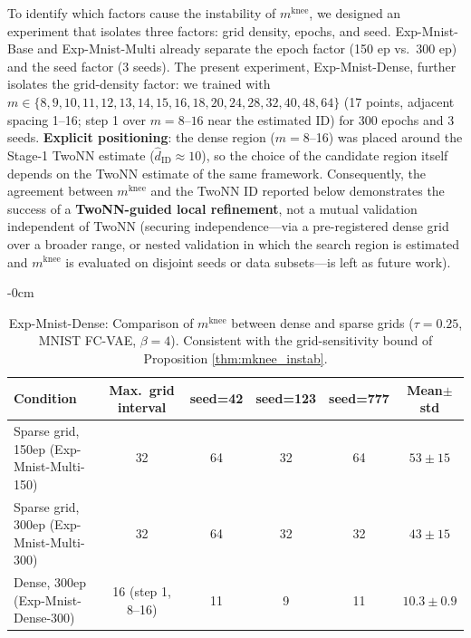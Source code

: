 \documentclass[make,article,submit,pdftex,moreauthors]{Definitions/mdpi}
\newcommand{\mknee}{m^{\mathrm{knee}}}
\begin{document}
To identify which factors cause the instability of $\mknee$, we designed an
experiment that isolates three factors: grid density, epochs, and seed.
Exp-Mnist-Base and Exp-Mnist-Multi already separate the epoch factor (150 ep vs.\ 300 ep) and
the seed factor (3 seeds).
The present experiment, Exp-Mnist-Dense, further isolates the grid-density factor: we trained
with $m \in \{8,9,10,11,12,13,14,15,16,18,20,24,28,32,40,48,64\}$
(17 points, adjacent spacing 1--16; step 1 over $m=8$--$16$ near the estimated ID) for 300 epochs and 3 seeds.
\textbf{Explicit positioning}: the dense region ($m = 8$--16) was placed around the Stage-1
TwoNN estimate ($\hat{d}_\mathrm{ID} \approx 10$), so the choice of the candidate region
itself depends on the TwoNN estimate of the same framework.
Consequently, the agreement between $\mknee$ and the TwoNN ID reported below demonstrates
the success of a \textbf{TwoNN-guided local refinement}, not a mutual validation
independent of TwoNN
(securing independence---via a pre-registered dense grid over a broader range, or nested
validation in which the search region is estimated and $\mknee$ is evaluated on disjoint
seeds or data subsets---is left as future work).

\begin{table}[H]
\begin{adjustwidth}{-\extralength}{0cm}
\centering
\caption{Exp-Mnist-Dense: Comparison of $\mknee$ between dense and sparse grids ($\tau=0.25$, MNIST FC-VAE, $\beta=4$). Consistent with the grid-sensitivity bound of Proposition \ref{thm:mknee_instab}.}
\label{tab:el_mknee}
\small
\begin{tabular}{lccccc}
\toprule
Condition & Max.\ grid interval & seed=42 & seed=123 & seed=777 & Mean$\pm$std \\
\midrule
Sparse grid, 150ep (Exp-Mnist-Multi-150) & 32 & 64 & 32 & 64 & $53 \pm 15$ \\
Sparse grid, 300ep (Exp-Mnist-Multi-300) & 32 & 64 & 32 & 32 & $43 \pm 15$ \\
Dense, 300ep (Exp-Mnist-Dense-300) & 16 (step 1, 8--16) & 11 & 9 & 11 & $10.3 \pm 0.9$ \\
\bottomrule
\end{tabular}
\end{adjustwidth}
\end{table}
\end{document}
